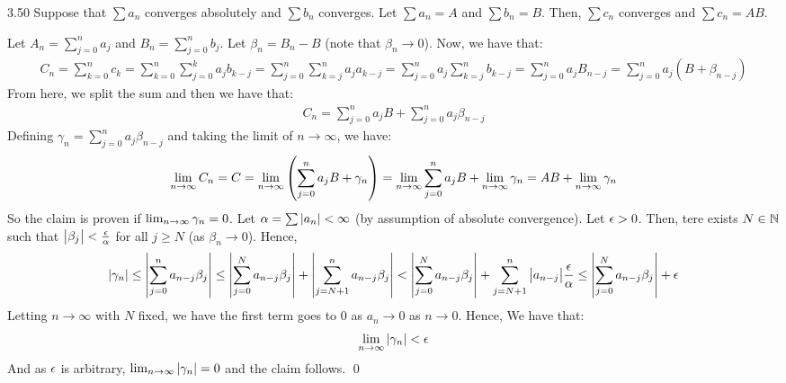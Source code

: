\setcounter{rudin}{49}
\begin{theorem}{}{3.50}
    Suppose that $\sum a_n$ converges absolutely and $\sum b_n$ converges. Let $\sum a_n = A$ and $\sum b_n = B$. Then, $\sum c_n$ converges and $\sum c_n = AB$.
\end{theorem}
\begin{nproof}
    Let $A_n = \sum_{j=0}^n a_j$ and $B_n = \sum_{j=0}^n b_j$. Let $\beta_n = B_n - B$ (note that $\beta_n \rightarrow 0$). Now, we have that:
    \begin{align*}
        C_n  = \sum_{k=0}^n c_k = \sum_{k=0}^n \sum_{j=0}^k a_j b_{k-j} = \sum_{j=0}^n \sum_{k=j}^n a_j a_{k-j} = \sum_{j=0}^n a_j \sum_{k=j}^n b_{k-j} = \sum_{j=0}^n a_j B_{n-j} = \sum_{j=0}^n a_j(B + \beta_{n-j})
    \end{align*}
    From here, we split the sum and then we have that:
    \begin{align*}
        C_n = \sum_{j=0}^n a_jB + \sum_{j=0}^n a_j\beta_{n-j}
    \end{align*}
    Defining $\gamma_n = \sum_{j=0}^n a_j\beta_{n-j}$ and taking the limit of $n \rightarrow \infty$, we have:
    \begin{align*}
        \lim_{n \rightarrow \infty} C_n = C = \lim_{n \rightarrow \infty} \left(\sum_{j=0}^n a_jB + \gamma_n\right) = \lim_{n \rightarrow \infty} \sum_{j=0}^n a_jB + \lim_{n \rightarrow \infty} \gamma_n = AB + \lim_{n \rightarrow \infty} \gamma_n
    \end{align*}
    So the claim is proven if $\lim_{n \rightarrow \infty} \gamma_n = 0$. Let $\alpha = \sum \abs{a_n} < \infty$ (by assumption of absolute convergence). Let $\epsilon > 0$. Then, tere exists $N \in \mathbb{N}$ such that $\abs{\beta_j} < \frac{\epsilon}{\alpha}$ for all $j \geq N$ (as $\beta_n \rightarrow 0$). Hence, 
    \begin{align*}
        \abs{\gamma_n} \leq \abs{\sum_{j=0}^n a_{n-j}\beta_j} \leq \abs{\sum_{j=0}^N a_{n-j}\beta_j} + \abs{\sum_{j=N+1}^n a_{n-j}\beta_j} < \abs{\sum_{j=0}^N a_{n-j}\beta_j} + \sum_{j=N+1}^n\abs{a_{n-j}}\frac{\epsilon}{\alpha} \leq \abs{\sum_{j=0}^N a_{n-j}\beta_j} + \epsilon
    \end{align*}
    Letting $n \rightarrow \infty$ with $N$ fixed, we have the first term goes to $0$ as $a_n \rightarrow 0$ as $n \rightarrow 0$. Hence, We have that:
    \begin{align*}
        \lim_{n \rightarrow \infty} \abs{\gamma_n} < \epsilon
    \end{align*}
    And as $\epsilon$ is arbitrary, $\lim_{n \rightarrow \infty} \abs{\gamma_n} = 0$ and the claim follows. \qed
\end{nproof}
